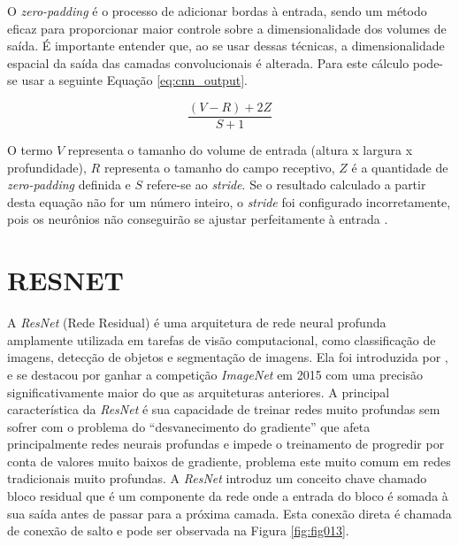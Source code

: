 O \textit{zero-padding} é o processo de adicionar bordas à entrada, sendo um método eficaz para proporcionar maior controle sobre a dimensionalidade dos volumes de saída. É importante entender que, ao se usar dessas técnicas, a dimensionalidade espacial da saída das camadas convolucionais é alterada. Para este cálculo pode-se usar a seguinte Equação \ref{eq:cnn_output}.

\begin{equation}
\frac{(V - R) + 2Z}{S + 1}
\label{eq:cnn_output}
\end{equation}

O termo $V$ representa o tamanho do volume de entrada (altura x largura x profundidade), $R$ representa o tamanho do campo receptivo, $Z$ é a quantidade de \textit{zero-padding} definida e $S$ refere-se ao \textit{stride}. Se o resultado calculado a partir desta equação não for um número inteiro, o \textit{stride} foi configurado incorretamente, pois os neurônios não conseguirão se ajustar perfeitamente à entrada \cite{osheaIntroductionConvolutionalNeural2015c}.

\section{RESNET}
\label{sec:resnet}

A \textit{ResNet} (Rede Residual) é uma arquitetura de rede neural profunda amplamente utilizada em tarefas de visão computacional, como classificação de imagens, detecção de objetos e segmentação de imagens. Ela foi introduzida por , e se destacou por ganhar a competição \textit{ImageNet} em 2015 com uma precisão significativamente maior do que as arquiteturas anteriores. A principal característica da \textit{ResNet} é sua capacidade de treinar redes muito profundas sem sofrer com o problema do ``desvanecimento do gradiente'' que afeta principalmente redes neurais profundas e impede o treinamento de progredir por conta de valores muito baixos de gradiente, problema este muito comum em redes tradicionais muito profundas. A \textit{ResNet} introduz um conceito chave chamado bloco residual que é um componente da rede onde a entrada do bloco é somada à sua saída antes de passar para a próxima camada. Esta conexão direta é chamada de conexão de salto e pode ser observada na Figura \ref{fig:fig013}.

